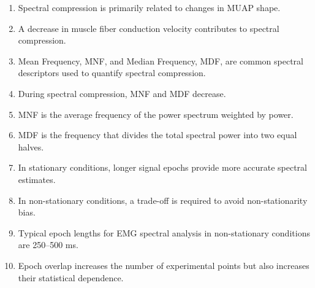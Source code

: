 \begin{enumerate}[label=\arabic*.]
    \item Spectral compression is primarily related to changes in MUAP shape.
    
    \item A decrease in muscle fiber conduction velocity contributes to spectral compression.
    
    \item Mean Frequency, MNF, and Median Frequency, MDF, are common spectral descriptors used to quantify spectral compression.
    
    \item During spectral compression, MNF and MDF decrease.
    
    \item MNF is the average frequency of the power spectrum weighted by power.
    
    \item MDF is the frequency that divides the total spectral power into two equal halves.
    
    \item In stationary conditions, longer signal epochs provide more accurate spectral estimates.
    
    \item In non-stationary conditions, a trade-off is required to avoid non-stationarity bias.
    
    \item Typical epoch lengths for EMG spectral analysis in non-stationary conditions are 250--500 ms.
    
    \item Epoch overlap increases the number of experimental points but also increases their statistical dependence.
\end{enumerate}

